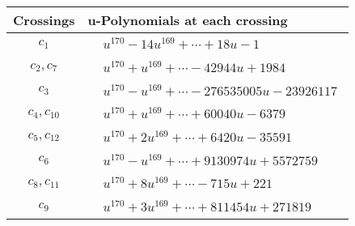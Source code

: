 \documentclass[1p]{elsarticle_modified}
\theoremstyle{definition}
\begin{document}
\begin{tabular}{m{50pt}|m{274pt}}
Crossings & \hspace{64pt}u-Polynomials at each crossing \\
\hline $$\begin{aligned}c_{1}\end{aligned}$$&$\begin{aligned}
&u^{170}-14 u^{169}+\cdots+18 u-1
\end{aligned}$\\
\hline $$\begin{aligned}c_{2},c_{7}\end{aligned}$$&$\begin{aligned}
&u^{170}+u^{169}+\cdots-42944 u+1984
\end{aligned}$\\
\hline $$\begin{aligned}c_{3}\end{aligned}$$&$\begin{aligned}
&u^{170}- u^{169}+\cdots-276535005 u-23926117
\end{aligned}$\\
\hline $$\begin{aligned}c_{4},c_{10}\end{aligned}$$&$\begin{aligned}
&u^{170}+u^{169}+\cdots+60040 u-6379
\end{aligned}$\\
\hline $$\begin{aligned}c_{5},c_{12}\end{aligned}$$&$\begin{aligned}
&u^{170}+2 u^{169}+\cdots+6420 u-35591
\end{aligned}$\\
\hline $$\begin{aligned}c_{6}\end{aligned}$$&$\begin{aligned}
&u^{170}- u^{169}+\cdots+9130974 u+5572759
\end{aligned}$\\
\hline $$\begin{aligned}c_{8},c_{11}\end{aligned}$$&$\begin{aligned}
&u^{170}+8 u^{169}+\cdots-715 u+221
\end{aligned}$\\
\hline $$\begin{aligned}c_{9}\end{aligned}$$&$\begin{aligned}
&u^{170}+3 u^{169}+\cdots+811454 u+271819
\end{aligned}$\\
\hline
\end{tabular}\\~\\
\end{document}

